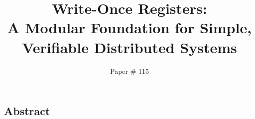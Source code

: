 \documentclass[letterpaper,twocolumn,10pt]{article}
\begin{document}
\date{}

\title{\bf Write-Once Registers:\\ A Modular Foundation for Simple, Verifiable Distributed Systems}
\author{Paper \# 115}

\maketitle

\thispagestyle{empty}


\subsection*{Abstract}

























{
\footnotesize 

}


\end{document}
